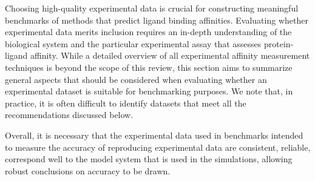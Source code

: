 \documentclass[9pt,bestpractices]{livecoms}
\begin{document}
Choosing high-quality experimental data is crucial for constructing meaningful benchmarks of methods that predict ligand binding affinities. 
Evaluating whether experimental data merits inclusion requires an in-depth understanding of the biological system and the particular experimental assay that assesses protein-ligand affinity.
While a detailed overview of all experimental affinity measurement techniques is beyond the scope of this review, this section aims to summarize general aspects that should be considered when evaluating whether an experimental dataset is suitable for benchmarking purposes. 
We note that, in practice, it is often difficult to identify datasets that meet all the recommendations discussed below.

Overall, it is necessary that the experimental data used in benchmarks intended to measure the accuracy of reproducing experimental data are consistent, reliable, correspond well to the model system that is used in the simulations, allowing robust conclusions on accuracy to be drawn.
\end{document}
